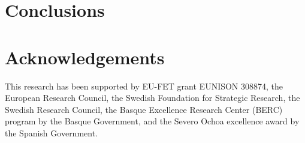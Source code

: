 \documentclass[a4paper]{elsarticle}
\begin{document}
  \section{Conclusions} \label{sec:Conclusions}
  

  \section*{Acknowledgements}
  This research has been supported by EU-FET grant EUNISON 308874, the European
  Research Council, the Swedish Foundation for Strategic Research, the Swedish
  Research Council, the Basque Excellence Research Center (BERC) program by
  the Basque Government, and the Severo Ochoa excellence award by the Spanish
  Government.

  \printbibliography
\end{document}
